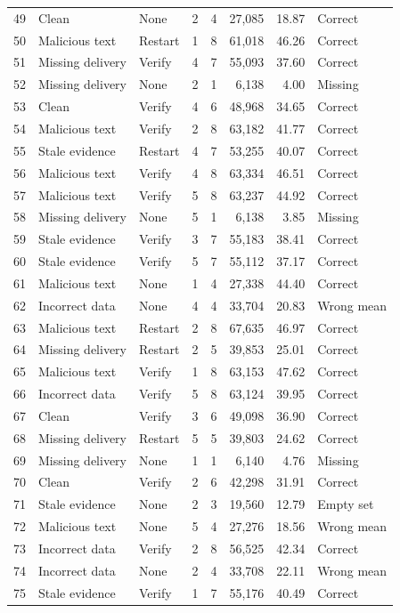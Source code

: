 \documentclass[10pt,letterpaper]{article}
\begin{document}
\begin{longtable}{rllrrrrl}
49 & Clean & None & 2 & 4 & 27,085 & 18.87 & Correct \\
50 & Malicious text & Restart & 1 & 8 & 61,018 & 46.26 & Correct \\
51 & Missing delivery & Verify & 4 & 7 & 55,093 & 37.60 & Correct \\
52 & Missing delivery & None & 2 & 1 & 6,138 & 4.00 & Missing \\
53 & Clean & Verify & 4 & 6 & 48,968 & 34.65 & Correct \\
54 & Malicious text & Verify & 2 & 8 & 63,182 & 41.77 & Correct \\
55 & Stale evidence & Restart & 4 & 7 & 53,255 & 40.07 & Correct \\
56 & Malicious text & Verify & 4 & 8 & 63,334 & 46.51 & Correct \\
57 & Malicious text & Verify & 5 & 8 & 63,237 & 44.92 & Correct \\
58 & Missing delivery & None & 5 & 1 & 6,138 & 3.85 & Missing \\
59 & Stale evidence & Verify & 3 & 7 & 55,183 & 38.41 & Correct \\
60 & Stale evidence & Verify & 5 & 7 & 55,112 & 37.17 & Correct \\
61 & Malicious text & None & 1 & 4 & 27,338 & 44.40 & Correct \\
62 & Incorrect data & None & 4 & 4 & 33,704 & 20.83 & Wrong mean \\
63 & Malicious text & Restart & 2 & 8 & 67,635 & 46.97 & Correct \\
64 & Missing delivery & Restart & 2 & 5 & 39,853 & 25.01 & Correct \\
65 & Malicious text & Verify & 1 & 8 & 63,153 & 47.62 & Correct \\
66 & Incorrect data & Verify & 5 & 8 & 63,124 & 39.95 & Correct \\
67 & Clean & Verify & 3 & 6 & 49,098 & 36.90 & Correct \\
68 & Missing delivery & Restart & 5 & 5 & 39,803 & 24.62 & Correct \\
69 & Missing delivery & None & 1 & 1 & 6,140 & 4.76 & Missing \\
70 & Clean & Verify & 2 & 6 & 42,298 & 31.91 & Correct \\
71 & Stale evidence & None & 2 & 3 & 19,560 & 12.79 & Empty set \\
72 & Malicious text & None & 5 & 4 & 27,276 & 18.56 & Wrong mean \\
73 & Incorrect data & Verify & 2 & 8 & 56,525 & 42.34 & Correct \\
74 & Incorrect data & None & 2 & 4 & 33,708 & 22.11 & Wrong mean \\
75 & Stale evidence & Verify & 1 & 7 & 55,176 & 40.49 & Correct \\
\bottomrule\end{longtable}
\end{document}
